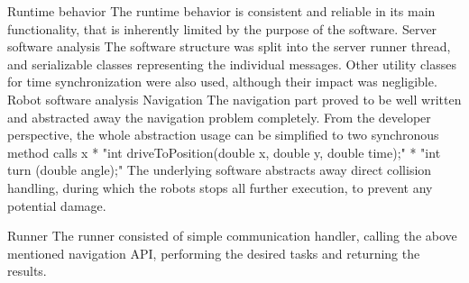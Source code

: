 \robotGrid
\sec Runtime behavior
The runtime behavior is consistent and reliable in its main functionality, that is inherently limited by the purpose of the software.
\sec Server software analysis
The software structure was split into the server runner thread, and serializable classes representing the individual messages. Other utility classes for time synchronization were also used, although their impact was negligible.
\sec Robot software analysis
\secc Navigation
The navigation part proved to be well written and abstracted away the navigation problem completely. From the developer perspective, the whole abstraction usage can be simplified to two synchronous method calls 
\begitems \style x
    * "int driveToPosition(double x, double y, double time);"
    * "int turn (double angle);"
\enditems
The underlying software abstracts away direct collision handling, during which the robots stops all further execution, to prevent any potential damage.

\secc Runner
The runner consisted of simple communication handler, calling the above mentioned navigation API, performing the desired tasks and returning the results.
